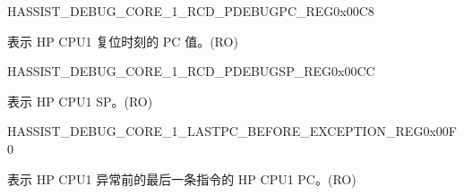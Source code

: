\begin{register}{H}{ASSIST\_DEBUG\_CORE\_1\_RCD\_PDEBUGPC\_REG}{0x00C8}\label{regdesc:ASSISTDEBUGCORE1RCDPDEBUGPCREG}
%
\regnewline%
\begin{regdesc}\begin{reglist}
\label{fielddesc:ASSISTDEBUGCORE1RCDPDEBUGPC}\item [ASSIST\_DEBUG\_CORE\_1\_RCD\_PDEBUGPC] 表示 HP CPU1 复位时刻的 PC 值。(RO)
\end{reglist}\end{regdesc}
\end{register}


\begin{register}{H}{ASSIST\_DEBUG\_CORE\_1\_RCD\_PDEBUGSP\_REG}{0x00CC}\label{regdesc:ASSISTDEBUGCORE1RCDPDEBUGSPREG}
%
\regnewline%
\begin{regdesc}\begin{reglist}
\label{fielddesc:ASSISTDEBUGCORE1RCDPDEBUGSP}\item [ASSIST\_DEBUG\_CORE\_1\_RCD\_PDEBUGSP] 表示 HP CPU1 SP。(RO)
\end{reglist}\end{regdesc}
\end{register}


\begin{register}{H}{ASSIST\_DEBUG\_CORE\_1\_LASTPC\_BEFORE\_EXCEPTION\_REG}{0x00F0}\label{regdesc:ASSISTDEBUGCORE1LASTPCBEFOREEXCEPTIONREG}
%
\regnewline%
\begin{regdesc}\begin{reglist}
\label{fielddesc:ASSISTDEBUGCORE1LASTPCBEFOREEXC}\item [ASSIST\_DEBUG\_CORE\_1\_LASTPC\_BEFORE\_EXC] 表示 HP CPU1 异常前的最后一条指令的 HP CPU1 PC。(RO)
\end{reglist}\end{regdesc}
\end{register}


